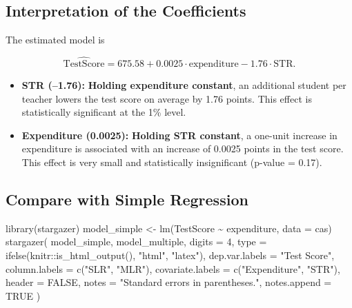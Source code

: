 \documentclass[
  12pt,
  letterpaper,
]{scrbook}
\newenvironment{Shaded}{\begin{snugshade}}{\end{snugshade}}
\newcommand{\AttributeTok}[1]{\textcolor[rgb]{0.40,0.45,0.13}{#1}}
\newcommand{\ConstantTok}[1]{\textcolor[rgb]{0.56,0.35,0.01}{#1}}
\newcommand{\DecValTok}[1]{\textcolor[rgb]{0.68,0.00,0.00}{#1}}
\newcommand{\FunctionTok}[1]{\textcolor[rgb]{0.28,0.35,0.67}{#1}}
\newcommand{\NormalTok}[1]{\textcolor[rgb]{0.00,0.23,0.31}{#1}}
\newcommand{\OtherTok}[1]{\textcolor[rgb]{0.00,0.23,0.31}{#1}}
\newcommand{\SpecialCharTok}[1]{\textcolor[rgb]{0.37,0.37,0.37}{#1}}
\newcommand{\StringTok}[1]{\textcolor[rgb]{0.13,0.47,0.30}{#1}}
\providecommand{\tightlist}{%
  \setlength{\itemsep}{0pt}\setlength{\parskip}{0pt}}
\renewcommand{\tightlist}{\setlength{\itemsep}{0.5\baselineskip}\setlength{\parskip}{0.2\baselineskip}}
\theoremstyle{definition}
\theoremstyle{plain}
\theoremstyle{remark}
\begin{document}
\subsection{Interpretation of the
Coefficients}\label{interpretation-of-the-coefficients}

The estimated model is

\[
\widehat{\text{TestScore}} = 675.58 + 0.0025 \cdot \text{expenditure} - 1.76 \cdot \text{STR}.
\]

\begin{itemize}
\tightlist
\item
  \textbf{STR (--1.76):} \textbf{Holding expenditure constant}, an
  additional student per teacher lowers the test score on average by
  1.76 points. This effect is statistically significant at the 1\%
  level.
\item
  \textbf{Expenditure (0.0025):} \textbf{Holding STR constant}, a
  one-unit increase in expenditure is associated with an increase of
  0.0025 points in the test score. This effect is very small and
  statistically insignificant (p-value = 0.17).
\end{itemize}

\subsection{Compare with Simple
Regression}\label{compare-with-simple-regression}

\begin{Shaded}
\begin{Highlighting}[]
\FunctionTok{library}\NormalTok{(stargazer)}
\NormalTok{model\_simple }\OtherTok{\textless{}{-}} \FunctionTok{lm}\NormalTok{(TestScore }\SpecialCharTok{\textasciitilde{}}\NormalTok{ expenditure, }\AttributeTok{data =}\NormalTok{ cas)}
\FunctionTok{stargazer}\NormalTok{(}
\NormalTok{    model\_simple, model\_multiple,}
    \AttributeTok{digits =} \DecValTok{4}\NormalTok{,}
    \AttributeTok{type =} \FunctionTok{ifelse}\NormalTok{(knitr}\SpecialCharTok{::}\FunctionTok{is\_html\_output}\NormalTok{(), }\StringTok{"html"}\NormalTok{, }\StringTok{"latex"}\NormalTok{),}
    \AttributeTok{dep.var.labels =} \StringTok{"Test Score"}\NormalTok{,}
    \AttributeTok{column.labels =} \FunctionTok{c}\NormalTok{(}\StringTok{"SLR"}\NormalTok{, }\StringTok{"MLR"}\NormalTok{),}
    \AttributeTok{covariate.labels =} \FunctionTok{c}\NormalTok{(}\StringTok{"Expenditure"}\NormalTok{, }\StringTok{"STR"}\NormalTok{),}
    \AttributeTok{header =} \ConstantTok{FALSE}\NormalTok{,}
    \AttributeTok{notes =} \StringTok{"Standard errors in parentheses."}\NormalTok{,}
    \AttributeTok{notes.append =} \ConstantTok{TRUE}
\NormalTok{)}
\end{Highlighting}
\end{Shaded}
\end{document}
